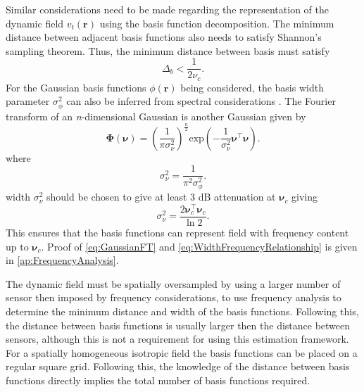 \documentclass[12pt]{iopart}
\begin{document}
Similar considerations need to be made regarding the representation of the dynamic field $v_t(\mathbf{r})$ using the basis function decomposition. The minimum distance between adjacent basis functions also needs to satisfy Shannon's sampling theorem. Thus, the minimum distance between basis must satisfy 
\begin{equation}
	\Delta_b < \frac{1}{2\nu_c}. 
\end{equation}
For the Gaussian basis functions $\phi(\mathbf{r})$ being considered, the basis width parameter $\sigma_{\phi}^2$ can also be inferred from spectral considerations \cite{Sanner1992,Scerri2009}. The Fourier transform of an \textit{n}-dimensional Gaussian is another Gaussian given by
\begin{equation}\label{eq:GaussianFT}
\boldsymbol\Phi(\boldsymbol \nu)=\left(\frac{1}{\pi\sigma_{\nu}^2}\right)^{\frac{n}{2}}\mathrm{exp}\left(-\frac{1}{\sigma_{\nu}^2}\boldsymbol\nu^\top \boldsymbol\nu\right).
\end{equation}
where 
\begin{equation}\label{eq:GaussianFTWidth}
	\sigma^2_{\nu} = \frac{1}{\pi^2\sigma_{\phi}^2}. 
\end{equation}
width $\sigma^2_{\nu}$ should be chosen to give at least 3 dB attenuation at $\boldsymbol\nu_c$ giving
\begin{equation}\label{eq:WidthFrequencyRelationship}
 \sigma^2_{\nu}=\frac{2\boldsymbol\nu_c^\top \boldsymbol\nu_c}{\ln 2}.
\end{equation}
This ensures that the basis functions can represent field with frequency content up to $\boldsymbol\nu_c $. Proof of \ref{eq:GaussianFT} and \ref{eq:WidthFrequencyRelationship} is given in \ref{ap:FrequencyAnalysis}.

The dynamic field must be spatially oversampled by using a larger number of sensor then imposed by frequency considerations, to use frequency analysis to determine the minimum distance and width of the basis functions. Following this, the distance between basis functions is usually larger then the distance between sensors, although this is not a requirement for using this estimation framework. For a spatially homogeneous isotropic field the basis functions can be placed on a regular square grid. Following this, the knowledge of the distance between basis functions directly implies the total number of basis functions required.
\end{document}
